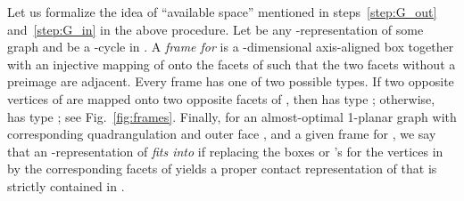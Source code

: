 \documentclass{article}
\newcommand{\df}{\textit}
\newcommand{\LL}{\xspace}
\begin{document}
\begin{comment}
\begin{figure}[h!]
 \begin{enumerate}
  \item Find all separating -cycles in the quadrangulation  of .
  \item If \textbf{(Case 1)} some inner vertex  of  is adjacent to two outer vertices of  let  be the set of the two -cycles in  consisting of  and three outer vertices of .
  \item Otherwise \textbf{(Case 2)} let  be the set of all maximal separating -cycles in .
  \item Consider the optimal 1-planar (multi)graph  obtained from  by replacing for each -cycle  all vertices strictly inside  by a single pair of crossing edges; see Fig.~\ref{fig:opt-H1}.\label{step:define_G_out}
  \item Compute an \LL-representation of  that has ``some space'' at each -cycle . In Case~2 this is done based on the shelled box-contact representation of  in Corollary~\ref{cor:goodCase}.\label{step:G_out}
  \item Go through all -cycles  and consider the almost-optimal 1-planar subgraph  of  induced by  and all vertices strictly inside ; see Fig.~\ref{fig:opt-H2}. Compute an \LL-representation of  recursively and insert it into the corresponding ``space'' in the \LL-representation of .\label{step:G_in}
 \end{enumerate}
 \caption{Outline of the procedure constructing an \LL-representation for any given optimal 1-planar graph  in linear time.}
 \label{fig:outline}
\end{figure}
\end{comment}


Let us formalize the idea of ``available space'' mentioned in steps~\ref{step:G_out} and~\ref{step:G_in} in the above procedure.
Let  be any \LL-representation of some graph  and  be a -cycle in .
A \df{frame for } is a -dimensional axis-aligned box  together with an injective mapping
of  onto the facets of  such that the two facets without a preimage are adjacent.
Every frame has one of two possible types.
If two opposite vertices of  are mapped onto two opposite facets of , then  has type ;
otherwise,  has type ;  see Fig.~\ref{fig:frames}.
Finally, for an almost-optimal 1-planar graph  with corresponding quadrangulation  and outer face , and a given frame  for , we say that an \LL-representation  of  \df{fits into } if replacing the boxes or \LL's for the vertices in  by the corresponding facets of  yields a proper contact representation of  that is strictly contained in .
\end{document}
